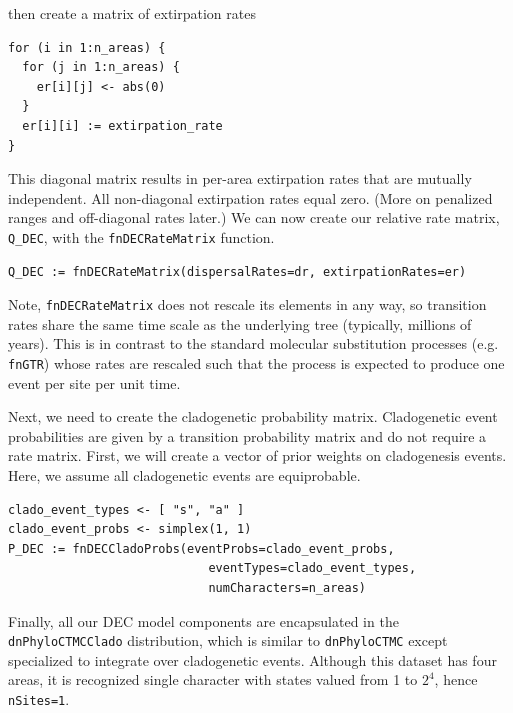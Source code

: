then create a matrix of extirpation rates

\begin{snugshade}
\begin{lstlisting}
for (i in 1:n_areas) {
  for (j in 1:n_areas) {
    er[i][j] <- abs(0)        
  }
  er[i][i] := extirpation_rate
}
\end{lstlisting}
\end{snugshade}

This diagonal matrix results in per-area extirpation rates that are mutually independent.
All non-diagonal extirpation rates equal zero.
(More on penalized ranges and off-diagonal rates later.)
We can now create our relative rate matrix, {\tt Q\_DEC}, with the {\tt fnDECRateMatrix} function.

\begin{snugshade}
\begin{lstlisting}
Q_DEC := fnDECRateMatrix(dispersalRates=dr, extirpationRates=er)
\end{lstlisting}
\end{snugshade}

Note, {\tt fnDECRateMatrix} does not rescale its elements in any way, so transition rates share the same time scale as the underlying tree (typically, millions of years).
This is in contrast to the standard molecular substitution processes (e.g. {\tt fnGTR}) whose rates are rescaled such that the process is expected to produce one event per site per unit time.

Next, we need to create the cladogenetic probability matrix.
Cladogenetic event probabilities are given by a transition probability matrix and do not require a rate matrix.
First, we will create a vector of prior weights on cladogenesis events.
Here, we assume all cladogenetic events are equiprobable.

\begin{snugshade}
\begin{lstlisting}
clado_event_types <- [ "s", "a" ]
clado_event_probs <- simplex(1, 1)
P_DEC := fnDECCladoProbs(eventProbs=clado_event_probs,
                            eventTypes=clado_event_types,
                            numCharacters=n_areas)
\end{lstlisting}
\end{snugshade}

Finally, all our DEC model components are encapsulated in the {\tt dnPhyloCTMCClado} distribution, which is similar to {\tt dnPhyloCTMC} except specialized to integrate over cladogenetic events.
Although this dataset has four areas, it is recognized single character with states valued from 1 to $2^4$, hence {\tt nSites=1}.

